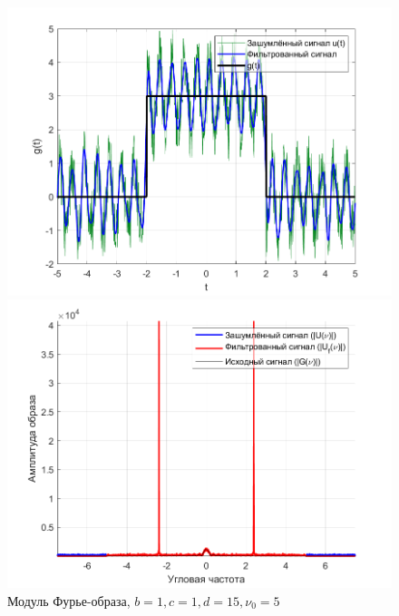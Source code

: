 \documentclass[a4paper]{article}
\begin{document}
\begin{figure}[H]
    \begin{minipage}{0.5\textwidth}
        \centering
        \includegraphics[width=\textwidth]{part2/1_1_15.png}
        \caption{$b = 1, c = 1, d = 15, \nu_0 = 5$}
    \end{minipage}    
    \begin{minipage}{0.5\textwidth}
        \centering
        \includegraphics[width=\textwidth]{part2/1_1_15_Fourier.png}
        \caption{Модуль Фурье-образа, $b = 1, c = 1, d = 15, \nu_0 = 5$}
    \end{minipage}
\end{figure}\
\end{document}
